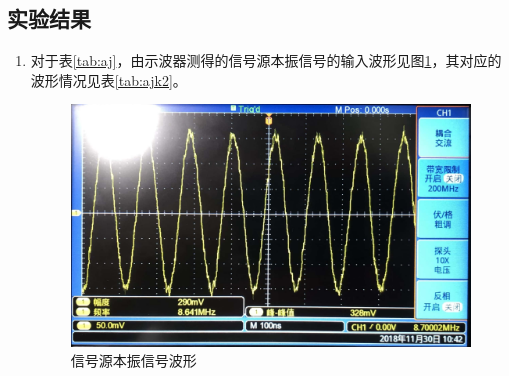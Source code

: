 \documentclass[12pt]{article}%
\numberwithin{equation}{section}
\begin{document}
\subsection{实验结果}
\begin{enumerate}\addtolength{\itemsep}{-1.5ex}
\item 对于表\ref{tab:aj}，由示波器测得的信号源本振信号的输入波形见图\ref{img:bzbx}，其对应的波形情况见表\ref{tab:ajk2}。
       \begin{figure}[ht]
  \centering
  \includegraphics[width=.4\textwidth]{gaopin3/gaopin311.jpg} 
  \caption{ 信号源本振信号波形} 
  \label{img:bzbx} 
\end{figure}


\end{enumerate}
\end{document}
